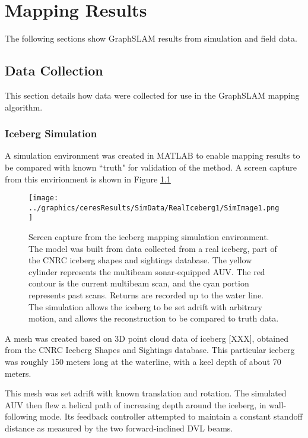 
\chapter{Mapping Results}
\label{ch.Results}

The following sections show GraphSLAM results from simulation and field data. 

\section{Data Collection}

This section details how data were collected for use in the GraphSLAM mapping algorithm.

\subsection{Iceberg Simulation}

A simulation environment was created in MATLAB to enable mapping results to be compared with known ``truth" for validation of the method. A screen capture from this envirionment is shown in Figure \ref{fig:IcebergSim}
 
 \begin{figure}[!htb]
   \centering
   \texttt{[image: ../graphics/ceresResults/SimData/RealIceberg1/SimImage1.png]} %
   \caption{Screen capture from the iceberg mapping simulation environment. The model was built from data collected from a real iceberg, part of the CNRC iceberg shapes and sightings database. The yellow cylinder represents the multibeam sonar-equipped AUV. The red contour is the current multibeam scan, and the cyan portion represents past scans. Returns are recorded up to the water line. The simulation allows the iceberg to be set adrift with arbitrary motion, and allows the reconstruction to be compared to truth data.}
   \label{fig:IcebergSim}
\end{figure}

A mesh was created based on 3D point cloud data of iceberg [XXX], obtained from the CNRC Iceberg Shapes and Sightings database. \cite{Verbit2006} This particular iceberg was roughly 150 meters long at the waterline, with a keel depth of about 70 meters.

This mesh was set adrift with known translation and rotation. The simulated AUV then flew a helical path of increasing depth around the iceberg, in wall-following mode. Its feedback controller attempted to maintain a constant standoff distance as measured by the two forward-inclined DVL beams.

